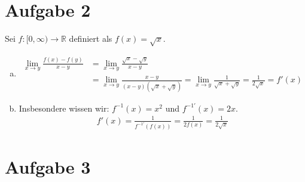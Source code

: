 \documentclass{scrreprt}
\newcommand{\RR}{\mathbb{R}}
\begin{document}
\section*{Aufgabe 2}
Sei $f \colon [0,\infty) \to \RR$ definiert als $f(x) = \sqrt{x}$.
\begin{enumerate}[(a)]
\item
\begin{align*}
  \lim\limits_{x \to y} \frac{f(x) - f(y)}{x - y} &= \lim\limits_{x \to y} \frac{\sqrt{x} - \sqrt{y}}{x-y}\\
   & = \lim\limits_{x \to y} \frac{x-y}{(x-y)(\sqrt{x}+\sqrt{y})} = \lim\limits_{x \to y} \frac{1}{\sqrt{x} + \sqrt{y}} = \frac{1}{2 \sqrt{x}} = f'(x)
\end{align*}
\item
  Insbesondere wissen wir: $f^{-1}(x) = x^2$ und $f^{-1'}(x) = 2x$.
  \begin{align*}
    f'(x) = \frac{1}{f^{-1'} (f(x))} = \frac{1}{2 f(x)} = \frac{1}{2\sqrt{x}}
  \end{align*}
\end{enumerate}   

\section*{Aufgabe 3}
\end{document}
